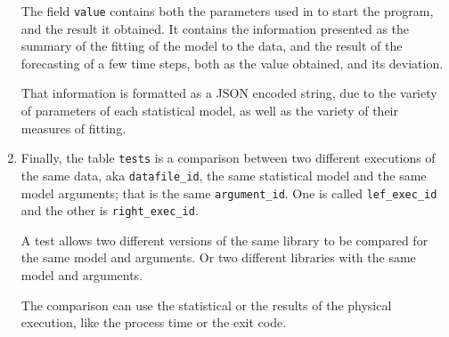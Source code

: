 \documentclass[a4paper,10pt]{article}
\begin{document}
\begin{enumerate}
        The field {\tt value} contains both the parameters used in
        to start the program, and the result it obtained. It
        contains the information presented as the summary of the
        fitting of the model to  the data, and the result of the
        forecasting of a few time steps, both as the value
        obtained, and its deviation.

        That information is formatted as a JSON encoded string,
        due to the variety of parameters of each statistical
        model, as well as the variety of their measures of fitting.

    \item \label{itm:tests}
        Finally, the table {\tt tests} is a comparison between two
        different executions of the same data, aka
        {\tt datafile\_id}, the same statistical model and the
        same model arguments; that is the same {\tt argument\_id}.
        One is called {\tt lef\_exec\_id} and the other is
        {\tt right\_exec\_id}.

        A test allows two different versions of the same library
        to be compared for the same model and arguments. Or two
        different libraries with the same model and arguments.

        The comparison can use the statistical or the results of
        the physical execution, like the process time or the
        exit code.
\end{enumerate}
\end{document}
